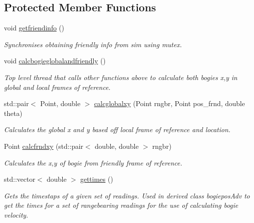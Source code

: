 \subsection*{Protected Member Functions}
\begin{DoxyCompactItemize}
\item 
\mbox{\label{classBogiepos_a4c8eedde0ce7c33ea7fe8e97aa6d412b}} 
void \hyperlink{classBogiepos_a4c8eedde0ce7c33ea7fe8e97aa6d412b}{getfriendinfo} ()
\begin{DoxyCompactList}\small\item\em Synchronises obtaining friendly info from sim using mutex. \end{DoxyCompactList}\item 
\mbox{\label{classBogiepos_a35efba7b6086dcdd62f1ff60cd392ccd}} 
void \hyperlink{classBogiepos_a35efba7b6086dcdd62f1ff60cd392ccd}{calcbogieglobalandfriendly} ()
\begin{DoxyCompactList}\small\item\em Top level thread that calls other functions above to calculate both bogies x,y in global and local frames of reference. \end{DoxyCompactList}\item 
std\+::pair$<$ Point, double $>$ \hyperlink{classBogiepos_a92af33e7edbae36591d1a564d9add2cc}{calcglobalxy} (Point rngbr, Point pos\+\_\+frnd, double theta)
\begin{DoxyCompactList}\small\item\em Calculates the global x and y based off local frame of reference and location. \end{DoxyCompactList}\item 
Point \hyperlink{classBogiepos_a48fc24fe51edd4e9835a141e369d5bd4}{calcfrndxy} (std\+::pair$<$ double, double $>$ rngbr)
\begin{DoxyCompactList}\small\item\em Calculates the x,y of bogie from friendly frame of reference. \end{DoxyCompactList}\item 
std\+::vector$<$ double $>$ \hyperlink{classBogiepos_a349025535b13e08322a94409e57873e9}{gettimes} ()
\begin{DoxyCompactList}\small\item\em Gets the timestaps of a given set of readings. Used in derived class bogiepos\+Adv to get the times for a set of rangebearing readings for the use of calculating bogie velocity. \end{DoxyCompactList}\end{DoxyCompactItemize}
